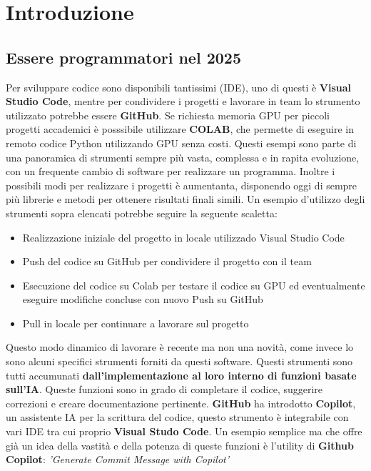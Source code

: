 \documentclass[12pt,a4paper,openright,twoside]{book}
\begin{document}
\chapter{Introduzione}
\label{chap:introduction}

\section{Essere programmatori nel 2025}
Per sviluppare codice sono disponibili tantissimi (IDE), uno di questi è \textbf{Visual Studio Code},
mentre per condividere i progetti e lavorare in team lo strumento utilizzato potrebbe essere  \textbf{GitHub}.
Se richiesta memoria GPU per piccoli progetti accademici è posssibile utilizzare \textbf{COLAB}, che permette di eseguire in remoto codice Python utilizzando GPU senza costi.
Questi esempi sono parte di una panoramica di strumenti sempre più vasta, complessa e in rapita evoluzione, con un frequente cambio di software per realizzare un programma.
Inoltre i possibili modi per realizzare i progetti è aumentanta, disponendo oggi di sempre più librerie e metodi per ottenere risultati finali simili.
Un esempio d'utilizzo degli strumenti sopra elencati potrebbe seguire la seguente scaletta:
\begin{itemize}
    \item Realizzazione iniziale del progetto in locale utilizzado Visual Studio Code
    \item Push del codice su GitHub per condividere il progetto con il team
    \item Esecuzione del codice su Colab per testare il codice su GPU ed eventualmente eseguire modifiche concluse con nuovo Push su GitHub
    \item Pull in locale per continuare a lavorare sul progetto
\end{itemize}
Questo modo dinamico di lavorare è recente ma non una novità, come invece lo sono alcuni specifici strumenti forniti da questi software.
Questi strumenti sono tutti accumunati \textbf{dall'implementazione al loro interno di funzioni basate sull'IA}.
Queste funzioni sono in grado di completare il codice, suggerire correzioni e creare documentazione pertinente.
\textbf{GitHub} ha introdotto \textbf{Copilot}, un assistente IA per la scrittura del codice, questo strumento è integrabile con vari IDE tra cui proprio \textbf{Visual Studo Code}.
Un esempio semplice ma che offre già un idea della vastità e della potenza di queste funzioni è l'utility di \textbf{Github Copilot}: \emph{'Generate Commit Message with Copilot'}
\end{document}
